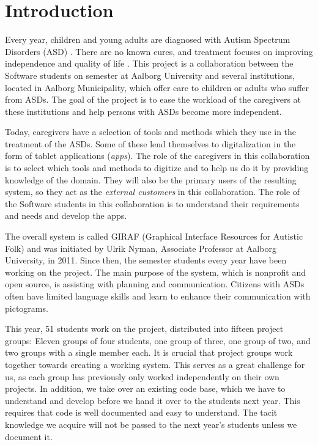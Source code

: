 \chapter{Introduction}
Every year, children and young adults are diagnosed with Autism Spectrum Disorders (ASD) \cite{autism_diagnosis_adults,autism_diagnosis_children}. There are no known cures, and treatment focuses on improving independence and quality of life \cite{Myers01112007}. This project is a collaboration between the Software students on  semester at Aalborg University and several institutions, located in Aalborg Municipality, which offer care to children or adults who suffer from ASDs. The goal of the project is to ease the workload of the caregivers at these institutions and help persons with ASDs become more independent. 

Today, caregivers have a selection of tools and methods which they use in the treatment of the ASDs. Some of these lend themselves to digitalization in the form of tablet applications (\emph{apps}). The role of the caregivers in this collaboration is to select which tools and methods to digitize and to help us do it by providing knowledge of the domain. They will also be the primary users of the resulting system, so they act as the \emph{external customers} in this collaboration. The role of the Software students in this collaboration is to understand their requirements and needs and develop the apps.

The overall system is called GIRAF (Graphical Interface Resources for Autistic Folk) and was initiated by Ulrik Nyman, Associate Professor at Aalborg University, in 2011. Since then, the  semester students every year have been working on the project. The main purpose of the system, which is nonprofit and open source, is assisting with planning and communication. Citizens with ASDs often have limited language skills and learn to enhance their communication with pictograms.

This year, 51 students work on the project, distributed into fifteen project groups: Eleven groups of four students, one group of three, one group of two, and two groups with a single member each. It is crucial that project groups work together towards creating a working system. This serves as a great challenge for us, as each group has previously only worked independently on their own projects. In addition, we take over an existing code base, which we have to understand and develop before we hand it over to the students next year. This requires that code is well documented and easy to understand. The tacit knowledge we acquire will not be passed to the next year's students unless we document it.

